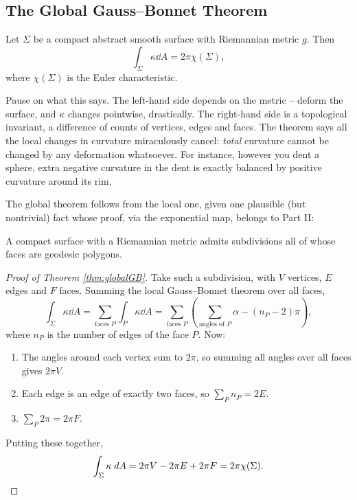 \documentclass[a4paper]{scrartcl}
\begin{document}
\subsection{The Global Gauss--Bonnet Theorem}

\begin{theorem}\label{thm:globalGB}
    Let $\Sigma$ be a compact abstract smooth surface with Riemannian metric $g$. Then
    $$
    \int_\Sigma \kappa \dd A = 2 \pi \chi(\Sigma),
    $$
    where $\chi(\Sigma)$ is the Euler characteristic.
\end{theorem}

Pause on what this says. The left-hand side depends on the metric -- deform the surface, and $\kappa$ changes pointwise, drastically. The right-hand side is a topological invariant, a difference of counts of vertices, edges and faces. The theorem says all the local changes in curvature miraculously cancel: \emph{total} curvature cannot be changed by any deformation whatsoever. For instance, however you dent a sphere, extra negative curvature in the dent is exactly balanced by positive curvature around its rim.

The global theorem follows from the local one, given one plausible (but nontrivial) fact whose proof, via the exponential map, belongs to Part II:

\begin{lemma}
    A compact surface with a Riemannian metric admits subdivisions all of whose faces are geodesic polygons.
\end{lemma}

\begin{proof}[Proof of Theorem \ref{thm:globalGB}]
    Take such a subdivision, with $V$ vertices, $E$ edges and $F$ faces. Summing the local Gauss--Bonnet theorem over all faces,
    $$
    \int_\Sigma \kappa \dd A = \sum_{\text{faces } P} \int_P \kappa \dd A = \sum_{\text{faces } P} \left(\sum_{\text{angles of } P} \alpha - (n_P - 2)\pi\right),
    $$
    where $n_P$ is the number of edges of the face $P$. Now:
    \begin{enumerate}[label=(\roman*)]
        \item The angles around each vertex sum to $2\pi$, so summing all angles over all faces gives $2\pi V$.
        \item Each edge is an edge of exactly two faces, so $\sum_P n_P = 2E$.
        \item $\sum_P 2\pi = 2\pi F$.
    \end{enumerate}
    Putting these together,
    $$
    \int_\Sigma \kappa \; d A = 2\pi V - 2\pi E + 2\pi F = 2\pi \chi(\Sigma). \qedhere
    $$
\end{proof}
\end{document}
